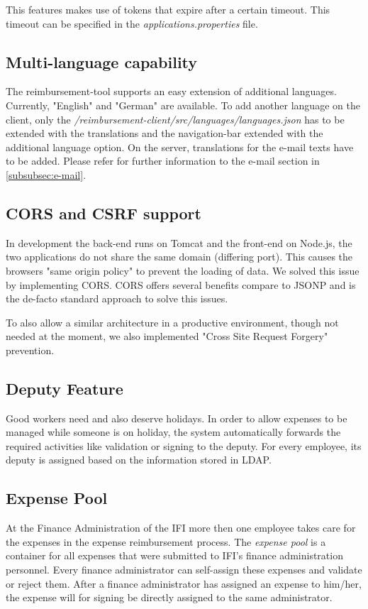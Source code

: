 This features makes use of tokens that expire after a certain timeout. This timeout can be specified in the \textit{applications.properties} file.


\subsection{Multi-language capability}
The reimbursement-tool supports an easy extension of additional languages. Currently, "English" and "German" are available. To add another language on the client, only the \textit{/reimbursement-client/src/languages/languages.json} has to be extended with the translations and the navigation-bar extended with the additional language option. \newline 
On the server, translations for the e-mail texts have to be added. Please refer for further information to the e-mail section in \ref{subsubsec:e-mail}.

\subsection{CORS and CSRF support}
In development the back-end runs on Tomcat and the front-end on Node.js, the two applications do not share the same domain (differing port). This causes the browsers "same origin policy" to prevent the loading of data. We solved this issue by implementing CORS. CORS offers several benefits compare to JSONP and is the de-facto standard approach to solve this issues. \par 

To also allow a similar architecture in a productive environment, though not needed at the moment, we also implemented "Cross Site Request Forgery" prevention.

\subsection{Deputy Feature}
Good workers need and also deserve holidays. In order to allow expenses to be managed while someone is on holiday, the system automatically forwards the required activities like validation or signing to the deputy. For every employee, its deputy is assigned based on the information stored in LDAP.

\subsection{Expense Pool}
At the Finance Administration of the IFI more then one employee takes care for the expenses in the expense reimbursement process. The \textit{expense pool} is a container for all expenses that were submitted to IFI's finance administration personnel. Every finance administrator can self-assign these expenses and validate or reject them. After a finance administrator has assigned an expense to him/her, the expense will for signing be directly assigned to the same administrator.


